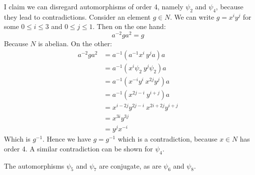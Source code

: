 I claim we can disregard automorphisms of order 4, namely \(\psi_2\) and \(\psi_4\), because they lead to contradictions.
Consider an element \(g \in N\).
We can write \(g = x^i y^j\) for some \(0 \leq i \leq 3\) and \(0 \leq j \leq 1\).
Then on the one hand:
\[a^{-2}ga^2 = g\]
Because \(N\) is abelian.
On the other:
\begin{align*}
    a^{-2}ga^2 &= a^{-1}(a^{-1}x^i\,y^j a)a \\
    &= a^{-1}(x^i\psi_2\ y^j\psi_2)a \\
    &= a^{-1}(x^{-i}y^i\ x^{2j}y^j)a \\
    &= a^{-1}(x^{2j-i}\ y^{i+j})a \\
    &= x^{i-2j}y^{2j-i}\ x^{2i+2j}y^{i+j} \\
    &= x^{3i}y^{3j} \\
    &= y^j x^{-i}
\end{align*}
Which is \(g^{-1}\).
Hence we have \(g = g^{-1}\) which is a contradiction, because \(x \in N\) has order 4.
A similar contradiction can be shown for \(\psi_4\).

The automorphisms \(\psi_5\) and \(\psi_7\) are conjugate, as are \(\psi_6\) and \(\psi_8\).

